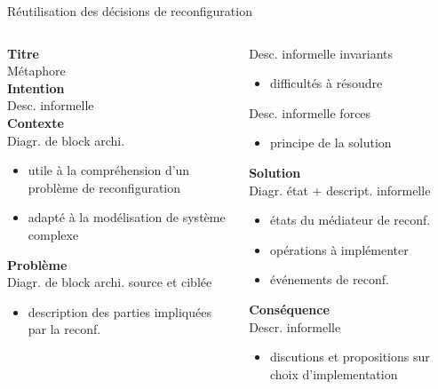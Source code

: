 \begin{frame}{Réutilisation des décisions de reconfiguration}
\begin{columns}
\begin{column}{0.5\textwidth}
\textbf{Titre}\\
Métaphore\\
\vspace{1mm}
\textbf{Intention}\\
Desc. informelle\\
\vspace{1mm}
\textbf{Contexte}\\
Diagr. de block archi.
\begin{itemize}
\item utile à la compréhension d'un problème de reconfiguration
\item adapté à la modélisation de système complexe
\end{itemize}                                                                   
\textbf{Problème}\\
Diagr. de block archi. source et ciblée 
\begin{itemize}
\item description des parties impliquées par la reconf. 
\end{itemize}
\end{column}
\begin{column}{0.5\textwidth}
Desc. informelle invariants
\begin{itemize}
\item difficultés à résoudre
\end{itemize}             
Desc. informelle forces                                                         
\begin{itemize}
\item principe de la solution
\end{itemize}             
\textbf{Solution}\\
Diagr. état + descript. informelle                                                              
\begin{itemize}
\item états du médiateur de reconf.
\item opérations à implémenter
\item événements de reconf.
\end{itemize}             
\textbf{Conséquence}\\
Descr. informelle
\begin{itemize}
\item discutions et propositions sur choix d'implementation 
\end{itemize}             
\end{column}
\end{columns}
\end{frame}

